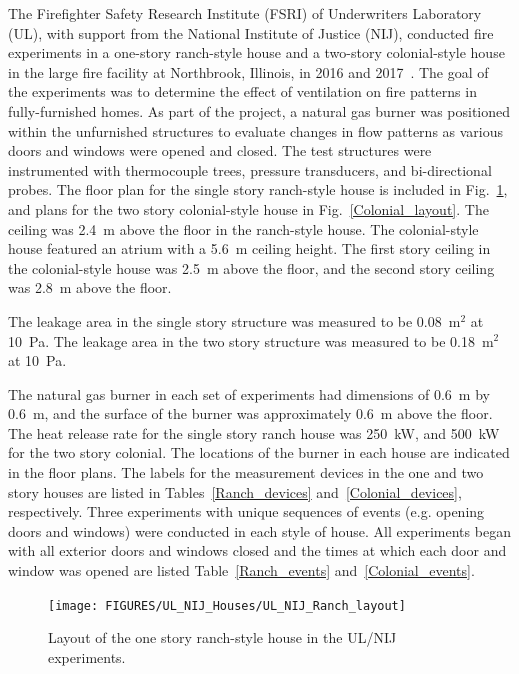The Firefighter Safety Research Institute (FSRI) of Underwriters Laboratory (UL), with support from the National Institute of Justice (NIJ), conducted fire experiments in a one-story ranch-style house and a two-story colonial-style house in the large fire facility at Northbrook, Illinois, in 2016 and 2017~\cite{Madrzykowski:2019}. The goal of the experiments was to determine the effect of ventilation on fire patterns in fully-furnished homes. As part of the project, a natural gas burner was positioned within the unfurnished structures to evaluate changes in flow patterns as various doors and windows were opened and closed. The test structures were instrumented with thermocouple trees, pressure transducers, and bi-directional probes. The floor plan for the single story ranch-style house is included in Fig.~\ref{Ranch_layout}, and plans for the two story colonial-style house in Fig.~\ref{Colonial_layout}. The ceiling was 2.4~m above the floor in the ranch-style house. The colonial-style house featured an atrium with a 5.6~m ceiling height. The first story ceiling in the colonial-style house was 2.5~m above the floor, and the second story ceiling was 2.8~m above the floor.

The leakage area in the single story structure was measured to be 0.08~m$^2$ at 10~Pa. The leakage area in the two story structure was measured to be 0.18~m$^2$ at 10~Pa.

The natural gas burner in each set of experiments had dimensions of 0.6~m by 0.6~m, and the surface of the burner was approximately 0.6~m above the floor. The heat release rate for the single story ranch house was 250~kW, and 500~kW for the two story colonial. The locations of the burner in each house are indicated in the floor plans. The labels for the measurement devices in the one and two story houses are listed in Tables~\ref{Ranch_devices} and~\ref{Colonial_devices}, respectively. Three experiments with unique sequences of events (e.g. opening doors and windows) were conducted in each style of house. All experiments began with all exterior doors and windows closed and the times at which each door and window was opened are listed Table~\ref{Ranch_events} and~\ref{Colonial_events}.

\begin{figure}[p]
\texttt{[image: FIGURES/UL\_NIJ\_Houses/UL\_NIJ\_Ranch\_layout]}
\caption[Layout of the one story ranch-style house in the UL/NIJ experiments]{Layout of the one story ranch-style house in the UL/NIJ experiments.}
\label{Ranch_layout}
\end{figure}

